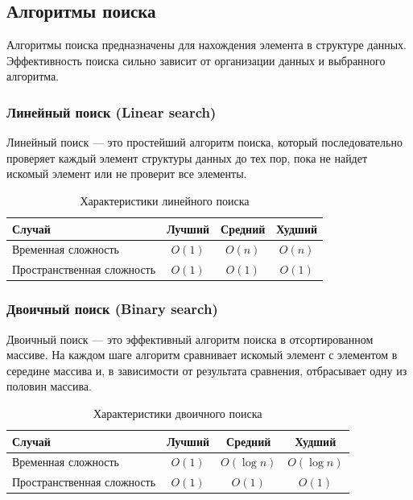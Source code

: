 \documentclass[a4paper,12pt]{article}
\begin{document}
\subsection{Алгоритмы поиска}
\label{subsec:алгоритмы-поиска}

Алгоритмы поиска предназначены для нахождения элемента в структуре данных. Эффективность поиска сильно зависит от организации данных и выбранного алгоритма.

\subsubsection{Линейный поиск (Linear search)}
\label{subsubsec:линейный-поиск-linear-search}

Линейный поиск --- это простейший алгоритм поиска, который последовательно проверяет каждый элемент структуры данных до тех пор, пока не найдет искомый элемент или не проверит все элементы.

\begin{table}[H]
    \centering
    \begin{tabular}{|l|c|c|c|}
        \hline
        Случай & Лучший & Средний & Худший \\
        \hline
        Временная сложность & $O(1)$ & $O(n)$ & $O(n)$ \\
        \hline
        Пространственная сложность & $O(1)$ & $O(1)$ & $O(1)$ \\
        \hline
    \end{tabular}
    \caption{Характеристики линейного поиска}
\end{table}

\subsubsection{Двоичный поиск (Binary search)}
\label{subsubsec:двоичный-поиск-binary-search}

Двоичный поиск --- это эффективный алгоритм поиска в отсортированном массиве. На каждом шаге алгоритм сравнивает искомый элемент с элементом в середине массива и, в зависимости от результата сравнения, отбрасывает одну из половин массива.

\begin{table}[H]
    \centering
    \begin{tabular}{|l|c|c|c|}
        \hline
        Случай & Лучший & Средний & Худший \\
        \hline
        Временная сложность & $O(1)$ & $O(\log n)$ & $O(\log n)$ \\
        \hline
        Пространственная сложность & $O(1)$ & $O(1)$ & $O(1)$ \\
        \hline
    \end{tabular}
    \caption{Характеристики двоичного поиска}
\end{table}
\end{document}
